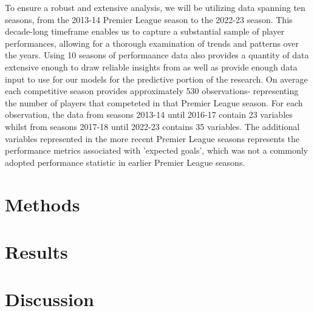 \documentclass[12pt]{article}
\begin{document}
To ensure a robust and extensive analysis, we will be utilizing data spanning
ten seasons, from the 2013-14 Premier League season to the 2022-23 season.
This decade-long timeframe enables us to capture a substantial sample of player
performances, allowing for a thorough examination of trends and patterns over
the years. Using 10 seasons of performaance data also provides a quantity of 
data extensive enough to draw reliable insights from as well as provide enough
data input to use for our models for the predictive portion of the research.
On average each competitive season provides approximately 530 observations-
representing the number of players that competeted in that Premier League 
season. For each observation, the data from seasons 2013-14 until 2016-17 contain
23 variables whilst from seasons 2017-18 until 2022-23 contains 35 variables.
The additional variables represented in the more recent Premier League seasons
represents the performance metrics associated with 'expected goals', which was
not a commonly adopted performance statistic in earlier Premier League seasons.





\section{Methods}
\label{sec:meth}







\section{Results}
\label{sec:resu}


\section{Discussion}
\label{sec:disc}












 
\end{document}
